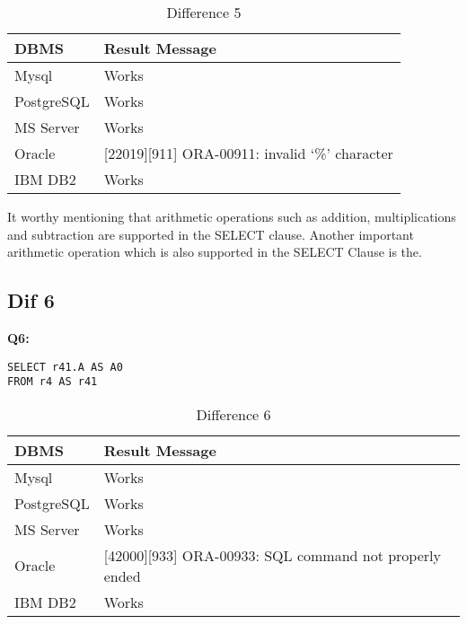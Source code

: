 \begin{table}[h]
\centering
\caption{Difference 5}
\label{my-label}
\begin{tabular}{|p{2cm}|p{11.5cm}| }
\hline
\textbf{DBMS} & \textbf{Result Message}                                \\ \hline
Mysql         & Works                                                  \\ \hline
PostgreSQL    & Works                                                  \\ \hline
MS Server     & Works                                                  \\ \hline
Oracle        & {[}22019{]}{[}911{]} ORA-00911: invalid ‘\%’ character \\ \hline
IBM DB2       & Works                                                  \\ \hline
\end{tabular}
\end{table}

It worthy mentioning that arithmetic operations such as addition, multiplications and  subtraction are supported in the SELECT clause. Another important arithmetic operation which is also  supported in the SELECT Clause is the.

\hfill\newpage
\subsection{Dif 6}
  
\textbf{Q6:}
\begin{mdframed}[backgroundcolor=lightgray!20]
\begin{lstlisting}[style=SQL]
SELECT r41.A AS A0
FROM r4 AS r41
\end{lstlisting}
\end{mdframed}

\begin{table}[h]
\centering
\caption{Difference 6}
\label{my-label}
\begin{tabular}{|p{2cm}|p{11.5cm}| }
\hline
\textbf{DBMS} & \textbf{Result Message}                                        \\ \hline
Mysql         & Works                                                          \\ \hline
PostgreSQL    & Works                                                          \\ \hline
MS Server     & Works                                                          \\ \hline
Oracle        & {[}42000{]}{[}933{]} ORA-00933: SQL command not properly ended \\ \hline
IBM DB2       & Works                                                          \\ \hline
\end{tabular}
\end{table}

